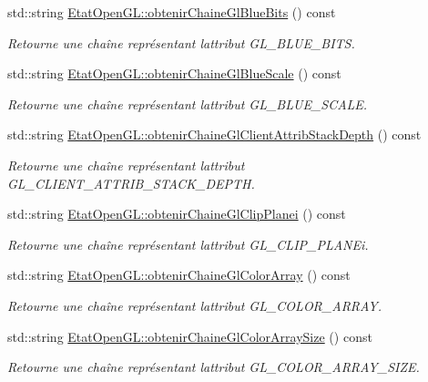 \begin{DoxyCompactItemize}
std\+::string \hyperlink{group__utilitaire_ga125172f1c5c4ef27c20c4e52a70ce38a}{Etat\+Open\+G\+L\+::obtenir\+Chaine\+Gl\+Blue\+Bits} () const 
\begin{DoxyCompactList}\small\item\em Retourne une chaîne représentant l\textquotesingle{}attribut G\+L\+\_\+\+B\+L\+U\+E\+\_\+\+B\+I\+T\+S. \end{DoxyCompactList}\item 
std\+::string \hyperlink{group__utilitaire_ga8422f585aba4fc07dcaac22e6cf587b3}{Etat\+Open\+G\+L\+::obtenir\+Chaine\+Gl\+Blue\+Scale} () const 
\begin{DoxyCompactList}\small\item\em Retourne une chaîne représentant l\textquotesingle{}attribut G\+L\+\_\+\+B\+L\+U\+E\+\_\+\+S\+C\+A\+L\+E. \end{DoxyCompactList}\item 
std\+::string \hyperlink{group__utilitaire_gad57f6d8da9cffeae2204a77e6e5f9292}{Etat\+Open\+G\+L\+::obtenir\+Chaine\+Gl\+Client\+Attrib\+Stack\+Depth} () const 
\begin{DoxyCompactList}\small\item\em Retourne une chaîne représentant l\textquotesingle{}attribut G\+L\+\_\+\+C\+L\+I\+E\+N\+T\+\_\+\+A\+T\+T\+R\+I\+B\+\_\+\+S\+T\+A\+C\+K\+\_\+\+D\+E\+P\+T\+H. \end{DoxyCompactList}\item 
std\+::string \hyperlink{group__utilitaire_ga7deb847efbc619585d5e8c9f6600204c}{Etat\+Open\+G\+L\+::obtenir\+Chaine\+Gl\+Clip\+Planei} () const 
\begin{DoxyCompactList}\small\item\em Retourne une chaîne représentant l\textquotesingle{}attribut G\+L\+\_\+\+C\+L\+I\+P\+\_\+\+P\+L\+A\+N\+Ei. \end{DoxyCompactList}\item 
std\+::string \hyperlink{group__utilitaire_ga8fae4f702f9be3574209f0721b6768ba}{Etat\+Open\+G\+L\+::obtenir\+Chaine\+Gl\+Color\+Array} () const 
\begin{DoxyCompactList}\small\item\em Retourne une chaîne représentant l\textquotesingle{}attribut G\+L\+\_\+\+C\+O\+L\+O\+R\+\_\+\+A\+R\+R\+A\+Y. \end{DoxyCompactList}\item 
std\+::string \hyperlink{group__utilitaire_gad1e82d8c71b8e2a76c806e1c92cbb669}{Etat\+Open\+G\+L\+::obtenir\+Chaine\+Gl\+Color\+Array\+Size} () const 
\begin{DoxyCompactList}\small\item\em Retourne une chaîne représentant l\textquotesingle{}attribut G\+L\+\_\+\+C\+O\+L\+O\+R\+\_\+\+A\+R\+R\+A\+Y\+\_\+\+S\+I\+Z\+E. \end{DoxyCompactList}\item 

\end{DoxyCompactItemize}
